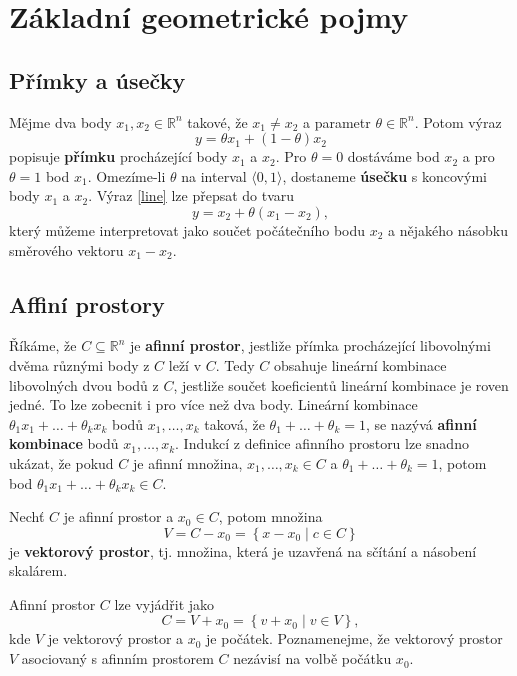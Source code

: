 \chapter{Základní geometrické pojmy}

\section{Přímky a úsečky}

Mějme dva body $x_1, x_2 \in \mathbb{R}^n$ takové, že $x_1 \neq x_2$ a parametr $\theta \in \mathbb{R}^n$. Potom výraz
\begin{equation}
    y = \theta x_1 + (1 - \theta) x_2
    \label{line}
\end{equation}
popisuje \textbf{přímku} procházející body $x_1$ a $x_2$. Pro $\theta = 0$ dostáváme bod $x_2$ a pro $\theta = 1$ bod $x_1$. Omezíme-li $\theta$ na interval $\langle 0, 1 \rangle$, dostaneme \textbf{úsečku} s koncovými body $x_1$ a $x_2$. Výraz \ref{line} lze přepsat do tvaru
$$
    y = x_2 + \theta (x_1 - x_2),
$$
který můžeme interpretovat jako součet počátečního bodu $x_2$ a nějakého násobku směrového vektoru $x_1 - x_2$.

\section{Affiní prostory}

Říkáme, že $C \subseteq \mathbb{R}^n$ je \textbf{afinní prostor}, jestliže přímka procházející libovolnými dvěma různými body z $C$ leží v $C$. Tedy $C$ obsahuje lineární kombinace libovolných dvou bodů z $C$, jestliže součet koeficientů lineární kombinace je roven jedné. To lze zobecnit i pro více než dva body. Lineární kombinace $\theta_1 x_1 + \dots + \theta_k x_k$ bodů $x_1, \dots, x_k$ taková, že $\theta_1 + \dots + \theta_k = 1$, se nazývá \textbf{afinní kombinace} bodů $x_1, \dots, x_k$. Indukcí z definice afinního prostoru lze snadno ukázat, že pokud $C$ je afinní množina, $x_1, \dots, x_k \in C$ a $\theta_1 + \dots + \theta_k = 1$, potom bod $\theta_1 x_1 + \dots + \theta_k x_k \in C$.

\noindent Nechť $C$ je afinní prostor a $x_0 \in C$, potom množina
$$
    V = C - x_0 = \left\{ x - x_0 \mid c \in C \right\}
$$
je \textbf{vektorový prostor}, tj. množina, která je uzavřená na sčítání a násobení skalárem.

\noindent Afinní prostor $C$ lze vyjádřit jako
$$
    C = V + x_0 = \left\{ v + x_0 \mid v \in V \right\},
$$
kde $V$ je vektorový prostor a $x_0$ je počátek. Poznamenejme, že vektorový prostor $V$ asociovaný s afinním prostorem $C$ nezávisí na volbě počátku $x_0$.

